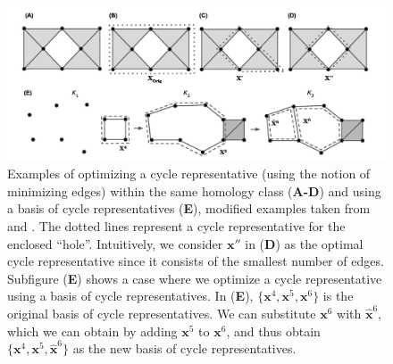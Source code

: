 \documentclass[utf8]{formatting_stuff/frontiersFPHY}
\newcommand{\optimalrep}{\mathbf{x}}
\theoremstyle{plain}
\theoremstyle{definition}
\begin{document}
\begin{figure}[h!]
\begin{center}
\includegraphics[width=1\textwidth]{figures/examples.jpg} 
\end{center}
\caption{Examples of optimizing a cycle representative (using the notion of minimizing edges) within the same homology class (\textbf{A-D}) and using a basis of cycle representatives (\textbf{E}), modified examples taken from \cite{Escolar2016} and \cite{Obayashi2018}. The dotted lines represent a cycle representative for the enclosed ``hole''. Intuitively, we consider $\optimalrep''$ in (\textbf{D}) as the optimal cycle representative since it consists of the smallest number of edges. Subfigure (\textbf{E}) shows a case where we optimize a cycle representative using a basis of cycle representatives. In (\textbf{E}), $\{\optimalrep^4, \optimalrep^5, \optimalrep^6\}$ is the original basis of cycle representatives. We can substitute $\optimalrep^6$ with $\hat{\optimalrep}^6$, which we can obtain by adding $\optimalrep^5$ to $\optimalrep^6$, and thus obtain $\{\optimalrep^4, \optimalrep^5, \hat{\optimalrep}^6\}$ as the new basis of cycle representatives.}\label{fig:example-optimal}
\end{figure}
\end{document}
